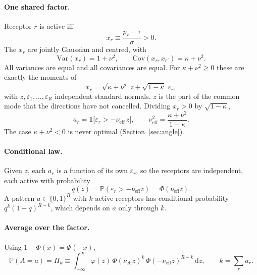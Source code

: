 \documentclass[11pt,a4paper]{article}
\newcommand{\PP}{\mathbb{P}}
\newcommand{\Var}{\mathrm{Var}}
\newcommand{\Cov}{\mathrm{Cov}}
\newcommand{\nueff}{\nu_{\mathrm{eff}}}
\newcommand{\one}{\mathbf{1}}
\begin{document}
\paragraph{One shared factor.} Receptor $r$ is active iff
\begin{equation}
  x_r\equiv\frac{p_r-\tau}{\sigma}>0 .
  \label{eq:x}
\end{equation}
The $x_r$ are jointly Gaussian and centred, with
\begin{equation}
  \Var(x_r)=1+\nu^2,
  \qquad
  \Cov(x_r,x_{r'})=\kappa+\nu^2 .
  \label{eq:covx}
\end{equation}
All variances are equal and all covariances are equal. For $\kappa+\nu^2\ge0$ these are
exactly the moments of
\begin{equation}
  x_r=\sqrt{\kappa+\nu^2}\;z+\sqrt{1-\kappa}\;\varepsilon_r,
  \label{eq:onefactor}
\end{equation}
with $z,\varepsilon_1,\dots,\varepsilon_R$ independent standard normals. $z$ is the part
of the common mode that the directions have not cancelled. Dividing $x_r>0$ by
$\sqrt{1-\kappa}$,
\begin{equation}
  \boxed{\;a_r=\one\big[\varepsilon_r>-\nueff\,z\big],
  \qquad
  \nueff^2=\frac{\kappa+\nu^2}{1-\kappa}.\;}
  \label{eq:nueff}
\end{equation}
The case $\kappa+\nu^2<0$ is never optimal (Section~\ref{sec:angle}).

\paragraph{Conditional law.} Given $z$, each $a_r$ is a function of its own
$\varepsilon_r$, so the receptors are independent, each active with probability
\begin{equation}
  q(z)=\PP(\varepsilon_r>-\nueff z)=\Phi(\nueff z).
  \label{eq:q}
\end{equation}
A pattern $a\in\{0,1\}^R$ with $k$ active receptors has conditional probability
$q^k(1-q)^{R-k}$, which depends on $a$ only through $k$.

\paragraph{Average over the factor.} Using $1-\Phi(x)=\Phi(-x)$,
\begin{equation}
  \boxed{\;\PP(A=a)=\Pi_k\equiv\int_{-\infty}^{\infty}\varphi(z)\,
  \Phi(\nueff z)^k\,\Phi(-\nueff z)^{R-k}\,\mathrm dz,
  \qquad k=\textstyle\sum_r a_r .\;}
  \label{eq:Pi}
\end{equation}
\end{document}
